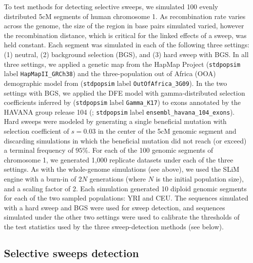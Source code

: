 \documentclass[hidelinks]{article}
\newcommand{\stdpopsim}{\texttt{stdpopsim}\xspace}
\newcommand{\drscomment}[1]{\textcolor{purple}{DRS: #1}}
\begin{document}
    To test methods for detecting selective sweeps, we simulated 100 evenly distributed 5cM
    segments of human chromosome 1.
    As recombination rate varies across the genome, the size of the region in base pairs simulated varied, however the recombination distance,
    which is critical for the linked effects of a sweep, was held constant.
    Each segment was simulated in each of the following three settings:
    (1) neutral, (2) background selection (BGS), and (3) hard sweep with BGS.
    In all three settings, we applied a genetic map from the HapMap Project
    \citep{international2007second} (\stdpopsim label \texttt{HapMapII\_GRCh38}) and
    the three-population out of Africa (OOA) demographic model from
    \cite{gutenkunst2009inferring} (\stdpopsim label \texttt{OutOfAfrica\_3G09}).
    In the two settings with BGS, we applied the DFE model with gamma-distributed selection coefficients inferred by
    \cite{kim2017inference} (\stdpopsim label \texttt{Gamma\_K17}) to exons annotated by the HAVANA group release 104
    (\cite{ensembl2018}; \stdpopsim label \texttt{ensembl\_havana\_104\_exons}).
    Hard sweeps were modeled by generating a single beneficial mutation 
    with selection coefficient of $s = 0.03$ in the center of the 5cM genomic segment
    and discarding simulations in which the beneficial mutation did not reach (or exceed) a terminal frequency of $95\%$.
    For each of the 100 genomic segments of chromosome 1, we generated 1,000 replicate datasets under each of the three settings.
    As with the whole-genome simulations (see above), we used the SLiM engine with a burn-in of $2N$ generations
    (where $N$ is the initial population size), and a scaling factor of 2.
    Each simulation generated 10 diploid genomic segments for each of the two sampled populations: YRI and CEU.
    The sequences simulated with a hard sweep and BGS were used for sweep detection,
    and sequences simulated under the other two settings were used to calibrate the thresholds of the test statistics
    used by the three sweep-detection methods (see below).

    \subsection*{Selective sweeps detection}
    
\end{document}
